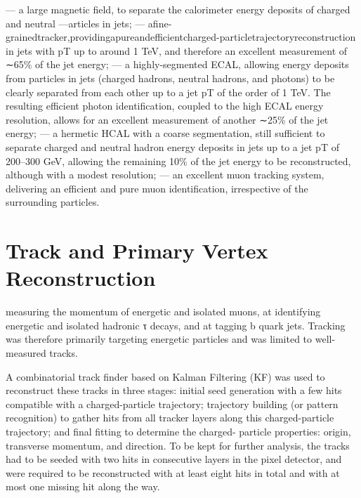 --- a large magnetic field, to separate the calorimeter energy deposits of charged and neutral
---articles in jets;
--- afine-grainedtracker,providingapureandefficientcharged-particletrajectoryreconstruction in jets with pT up to around 1 TeV, and therefore an excellent measurement of ∼65\% of the jet energy;
--- a highly-segmented ECAL, allowing energy deposits from particles in jets (charged hadrons, neutral hadrons, and photons) to be clearly separated from each other up to a jet pT of the order of 1 TeV. The resulting efficient photon identification, coupled to the high ECAL energy resolution, allows for an excellent measurement of another ∼25\% of the jet energy;
--- a hermetic HCAL with a coarse segmentation, still sufficient to separate charged and neutral hadron energy deposits in jets up to a jet pT of 200–300 GeV, allowing the remaining 10\% of the jet energy to be reconstructed, although with a modest resolution;
--- an excellent muon tracking system, delivering an efficient and pure muon identification, irrespective of the surrounding particles.




\section{Track and Primary Vertex Reconstruction}

measuring the momentum of energetic and isolated muons, at identifying energetic and isolated hadronic τ decays, and at tagging b quark jets. Tracking was therefore primarily targeting energetic particles and was limited to well- measured tracks.

A combinatorial track finder based on Kalman Filtering (KF) was used to reconstruct these tracks in three stages: initial seed generation with a few hits compatible with a charged-particle trajectory; trajectory building (or pattern recognition) to gather hits from all tracker layers along this charged-particle trajectory; and final fitting to determine the charged- particle properties: origin, transverse momentum, and direction.
To be kept for further analysis, the tracks had to be seeded with two hits in consecutive layers in the pixel detector, and were required to be reconstructed with at least eight hits in total and with at most one missing hit along the way.

